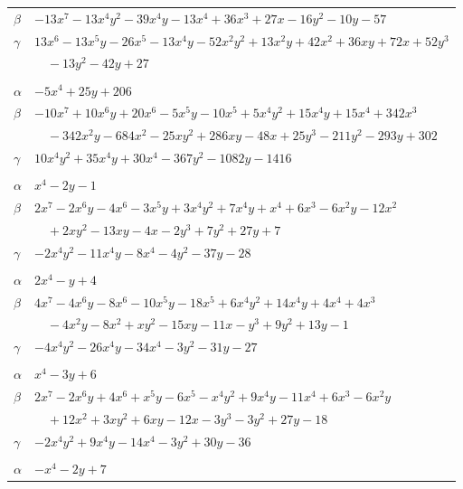 \documentclass[11pt]{article}
\begin{document}
\begin{longtable}{@{}ll@{}}
$\beta$ & $-13x^{7}-13x^{4}y^{2}-39x^{4}y-13x^{4}+36x^{3}+27x-16y^{2}-10y-57$\\
$\gamma$ & $13x^{6}-13x^{5}y-26x^{5}-13x^{4}y-52x^{2}y^{2}+13x^{2}y+42x^{2}+36xy+72x+52y^{3}$\\
 & $\quad -13y^{2}-42y+27$\\
\addlinespace[3pt]
\multicolumn{2}{@{}l}{$\{i,j\}=\{12,20\}$, $k_{ij}=2^{3}\cdot 3^{2}\cdot 17$}\\
$\alpha$ & $-5x^{4}+25y+206$\\
$\beta$ & $-10x^{7}+10x^{6}y+20x^{6}-5x^{5}y-10x^{5}+5x^{4}y^{2}+15x^{4}y+15x^{4}+342x^{3}$\\
 & $\quad -342x^{2}y-684x^{2}-25xy^{2}+286xy-48x+25y^{3}-211y^{2}-293y+302$\\
$\gamma$ & $10x^{4}y^{2}+35x^{4}y+30x^{4}-367y^{2}-1082y-1416$\\
\addlinespace[3pt]
\multicolumn{2}{@{}l}{$\{i,j\}=\{12,23\}$, $k_{ij}=2^{2}\cdot 3$}\\
$\alpha$ & $x^{4}-2y-1$\\
$\beta$ & $2x^{7}-2x^{6}y-4x^{6}-3x^{5}y+3x^{4}y^{2}+7x^{4}y+x^{4}+6x^{3}-6x^{2}y-12x^{2}$\\
 & $\quad +2xy^{2}-13xy-4x-2y^{3}+7y^{2}+27y+7$\\
$\gamma$ & $-2x^{4}y^{2}-11x^{4}y-8x^{4}-4y^{2}-37y-28$\\
\addlinespace[3pt]
\multicolumn{2}{@{}l}{$\{i,j\}=\{12,24\}$, $k_{ij}=2\cdot 5$}\\
$\alpha$ & $2x^{4}-y+4$\\
$\beta$ & $4x^{7}-4x^{6}y-8x^{6}-10x^{5}y-18x^{5}+6x^{4}y^{2}+14x^{4}y+4x^{4}+4x^{3}$\\
 & $\quad -4x^{2}y-8x^{2}+xy^{2}-15xy-11x-y^{3}+9y^{2}+13y-1$\\
$\gamma$ & $-4x^{4}y^{2}-26x^{4}y-34x^{4}-3y^{2}-31y-27$\\
\addlinespace[3pt]
\multicolumn{2}{@{}l}{$\{i,j\}=\{13,20\}$, $k_{ij}=2^{2}\cdot 3$}\\
$\alpha$ & $x^{4}-3y+6$\\
$\beta$ & $2x^{7}-2x^{6}y+4x^{6}+x^{5}y-6x^{5}-x^{4}y^{2}+9x^{4}y-11x^{4}+6x^{3}-6x^{2}y$\\
 & $\quad +12x^{2}+3xy^{2}+6xy-12x-3y^{3}-3y^{2}+27y-18$\\
$\gamma$ & $-2x^{4}y^{2}+9x^{4}y-14x^{4}-3y^{2}+30y-36$\\
\addlinespace[3pt]
\multicolumn{2}{@{}l}{$\{i,j\}=\{14,18\}$, $k_{ij}=2^{3}\cdot 3$}\\
$\alpha$ & $-x^{4}-2y+7$\\

\end{longtable}
\end{document}
